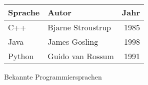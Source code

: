     \centering
    \begin{tabular}{llr}
        \toprule
        Sprache & Autor             & Jahr \\
        \midrule
        C++     & Bjarne Stroustrup & 1985 \\
        Java    & James Gosling     & 1998 \\
        Python  & Guido van Rossum  & 1991 \\
        \bottomrule
    \end{tabular}
    \caption{Bekannte Programmiersprachen}

